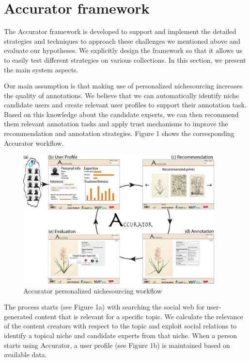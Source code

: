 \section{Accurator framework}
\label{architecture}
The Accurator framework is developed to support and implement the detailed strategies and techniques to approach these challenges we mentioned above and evaluate our hypotheses. We explicitly design the framework so that it allows us to easily test different strategies on various collections. In this section, we present the main system aspects.

Our main assumption is that making use of personalized nichesourcing increases the quality of annotations. We believe that we can automatically identify niche candidate users and create relevant user profiles to support their annotation task. Based on this knowledge about the candidate experts, we can then recommend them relevant annotation tasks and apply trust mechanisms to improve the recommendation and annotation strategies. Figure 1 shows the corresponding Accurator workflow. 

\begin{figure}[hbt]
	\centering
	\includegraphics[width=0.93\textwidth]{accurator_diagram.jpg}
  	\caption{Accurator personalized nichesourcing workflow}
\end{figure}

The process starts (see Figure 1a) with searching the social web for user-generated content that is relevant for a specific topic. We calculate the relevance of the content creators with respect to the topic and exploit social relations to identify a topical niche and candidate experts from that niche. When a person starts using Accurator, a user profile (see Figure 1b) is maintained based on available data.

